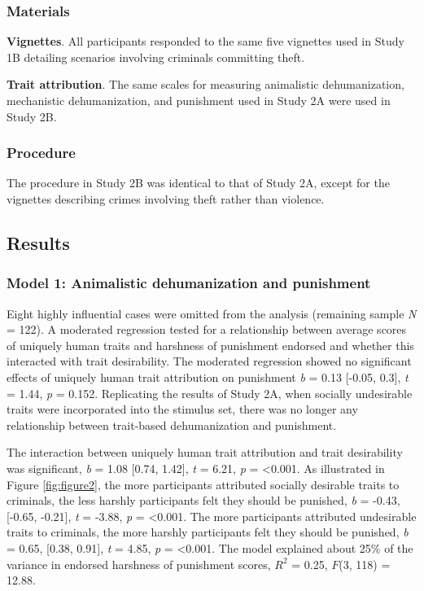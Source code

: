 \documentclass[
]{article}
\begin{document}
\hypertarget{materials-3}{%
\subsubsection{Materials}\label{materials-3}}

\textbf{Vignettes}. All participants responded to the same five vignettes used in Study 1B detailing scenarios involving criminals committing theft.

\textbf{Trait attribution}. The same scales for measuring animalistic dehumanization, mechanistic dehumanization, and punishment used in Study 2A were used in Study 2B.

\hypertarget{procedure-2}{%
\subsubsection{Procedure}\label{procedure-2}}

The procedure in Study 2B was identical to that of Study 2A, except for the vignettes describing crimes involving theft rather than violence.

\hypertarget{results-3}{%
\subsection{Results}\label{results-3}}

\hypertarget{model-1-animalistic-dehumanization-and-punishment-3}{%
\subsubsection{Model 1: Animalistic dehumanization and punishment}\label{model-1-animalistic-dehumanization-and-punishment-3}}

Eight highly influential cases were omitted from the analysis (remaining sample \emph{N} = 122). A moderated regression tested for a relationship between average scores of uniquely human traits and harshness of punishment endorsed and whether this interacted with trait desirability. The moderated regression showed no significant effects of uniquely human trait attribution on punishment \emph{b} = 0.13 {[}-0.05, 0.3{]}, \emph{t} = 1.44, \emph{p} = 0.152. Replicating the results of Study 2A, when socially undesirable traits were incorporated into the stimulus set, there was no longer any relationship between trait-based dehumanization and punishment.

The interaction between uniquely human trait attribution and trait desirability was significant, \emph{b} = 1.08 {[}0.74, 1.42{]}, \emph{t} = 6.21, \emph{p} = \textless0.001. As illustrated in Figure \ref{fig:figure2}, the more participants attributed socially desirable traits to criminals, the less harshly participants felt they should be punished, \emph{b} = -0.43, {[}-0.65, -0.21{]}, \emph{t} = -3.88, \emph{p} = \textless0.001. The more participants attributed undesirable traits to criminals, the more harshly participants felt they should be punished, \emph{b} = 0.65, {[}0.38, 0.91{]}, \emph{t} = 4.85, \emph{p} = \textless0.001. The model explained about 25\% of the variance in endorsed harshness of punishment scores, \(R^2\) = 0.25, \(F\)(3, 118) = 12.88.
\end{document}
